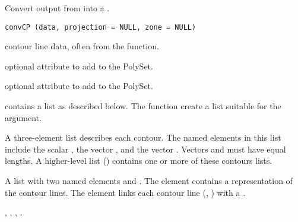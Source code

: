 \documentclass[letterpaper]{book}
\begin{document}
%
\begin{SeeAlso}\relax
{}
\end{SeeAlso}
%
\begin{Description}\relax
Convert output from  into a .
\end{Description}
%
\begin{Usage}
\begin{verbatim}
convCP (data, projection = NULL, zone = NULL)
\end{verbatim}
\end{Usage}
%
\begin{Arguments}
\begin{ldescription}
\item[\code{data}] contour line data, often from the
 function.
\item[\code{projection}] optional  attribute to add to
the PolySet.
\item[\code{zone}] optional  attribute to add to the PolySet.
\end{ldescription}
\end{Arguments}
%
\begin{Details}\relax
{} contains a list as described below. The
 function create a list suitable for the
 argument.

A three-element list describes each contour.  The named elements in
this list include the scalar , the vector , and
the vector .  Vectors  and  must have equal
lengths.  A higher-level list () contains one or more of
these contours lists.
\end{Details}
%
\begin{Value}
A list with two named elements  and .
The  element contains a  representation of the
contour lines.  The  element links each contour line
(, ) with a .
\end{Value}
%
\begin{SeeAlso}\relax
{},
,
,
.
\end{SeeAlso}
\end{document}
